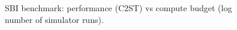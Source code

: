 \documentclass[twoside]{article}
\newcommand{\rromc}{R2OMC}
\newcommand{\CtwoST}{\texttt{C2ST}}
\begin{document}
\begin{figure}
  \caption{SBI benchmark: performance (C2ST) vs compute budget (log number of simulator runs).}
  \label{fig:sbi_experiments_two_moons}
\end{figure}

\end{document}

